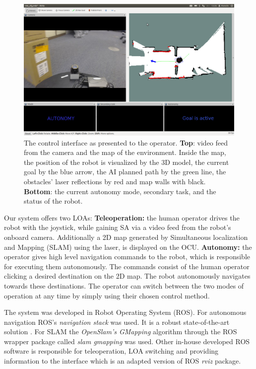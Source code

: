 \documentclass[a4paper,12pt,oneside,openright]{bhamthesis}
\begin{document}
\begin{figure}
	\centering
	\includegraphics[width=0.75\columnwidth]{chapter3_fig/interface_pilot.png}
	\caption{The control interface as presented to the operator. \textbf{Top}: video feed from the camera and the map of the environment. Inside the map, the position of the robot is visualized by the 3D model, the current goal by the blue arrow, the AI planned path by the green line, the obstacles' laser reflections by red and map walls with black. \textbf{Bottom}: the current autonomy mode, secondary task, and the status of the robot. }
	\label{fig:interface_pilot}
\end{figure}

Our system offers two LOAs: \textbf{Teleoperation:} the human operator drives the robot with the joystick, while gaining SA via a video feed from the robot's onboard camera. Additionally a 2D map generated by Simultaneous localization and Mapping (SLAM) using the laser, is displayed on the OCU. \textbf{Autonomy:} the operator gives high level navigation commands to the robot, which is responsible for executing them autonomously. The commands consist of the human operator clicking a desired destination on the 2D map. The robot autonomously navigates towards these destinations. The operator can switch between the two modes of operation at any time by simply using their chosen control method.

The system was developed in Robot Operating System (ROS). For autonomous navigation ROS's \textit{navigation stack} was used. It is a robust state-of-the-art solution \cite{Marder-Eppstein2010}. For SLAM the \textit{OpenSlam's GMapping} algorithm \cite{gmapping} through the ROS wrapper package called \textit{slam gmapping} was used. Other in-house developed ROS software is responsible for teleoperation, LOA switching and providing information to the interface which is an adapted version of ROS  \textit{rviz} package.
\end{document}
